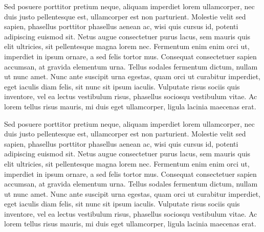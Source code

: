 \documentclass[twocolumn,prb,amsmath,amssymb,amsfonts]{revtex4}
\begin{document}
Sed posuere porttitor pretium neque, aliquam imperdiet lorem ullamcorper, nec duis justo pellentesque est, ullamcorper est non parturient. Molestie velit sed sapien, phasellus porttitor phasellus aenean ac, wisi quis cursus id, potenti adipiscing euismod sit. Netus augue consectetuer purus lacus, sem mauris quis elit ultricies, sit pellentesque magna lorem nec. Fermentum enim enim orci ut, imperdiet in ipsum ornare, a sed felis tortor mus. Consequat consectetuer sapien accumsan, at gravida elementum urna. Tellus sodales fermentum dictum, nullam ut nunc amet. Nunc ante suscipit urna egestas, quam orci ut curabitur imperdiet, eget iaculis diam felis, sit nunc sit ipsum iaculis. Vulputate risus sociis quis inventore, vel ea lectus vestibulum risus, phasellus sociosqu vestibulum vitae. Ac lorem tellus risus mauris, mi duis eget ullamcorper, ligula lacinia maecenas erat.

Sed posuere porttitor pretium neque, aliquam imperdiet lorem ullamcorper, nec duis justo pellentesque est, ullamcorper est non parturient. Molestie velit sed sapien, phasellus porttitor phasellus aenean ac, wisi quis cursus id, potenti adipiscing euismod sit. Netus augue consectetuer purus lacus, sem mauris quis elit ultricies, sit pellentesque magna lorem nec. Fermentum enim enim orci ut, imperdiet in ipsum ornare, a sed felis tortor mus. Consequat consectetuer sapien accumsan, at gravida elementum urna. Tellus sodales fermentum dictum, nullam ut nunc amet. Nunc ante suscipit urna egestas, quam orci ut curabitur imperdiet, eget iaculis diam felis, sit nunc sit ipsum iaculis. Vulputate risus sociis quis inventore, vel ea lectus vestibulum risus, phasellus sociosqu vestibulum vitae. Ac lorem tellus risus mauris, mi duis eget ullamcorper, ligula lacinia maecenas erat.
\end{document}
